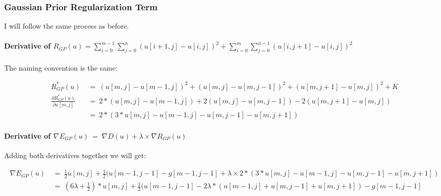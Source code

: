 \documentclass{report}
\begin{document}
			\subsubsection{Gaussian Prior Regularization Term}
			\startsubsection
				I will follow the same process as before.
				\vspace{-0.4cm} \paragraph{Derivative of $R_{GP}(u) = \sum_{i=0}^{m-1} \sum_{j=0}^{n} ( u[i+1,j] - u[i,j] )^2 + \sum_{i=0}^{m} \sum_{j=0}^{n-1} ( u[i,j+1] - u[i,j] )^2$}
				\startsubsection
					\vspace{0.2cm} The naming convention is the same:
				\closesection
				\begin{adjustwidth}{-4em}{}
					\vspace{-0.5cm}
					\begin{align*}
						R_{GP}^*(u) \ & = \ (u[m,j] - u[m-1,j])^2 + (u[m,j] - u[m,j-1])^2 + (u[m,j+1] - u[m,j])^2 + K \\
						\frac{\partial R_{GP}^*(u)}{\partial u[m,j]} \ & = \ 2 * (u[m,j] - u[m-1,j]) + 2 (u[m,j] - u[m,j-1]) - 2 (u[m,j+1] - u[m,j]) \\
						& = \ 2 * (3 * u[m,j] - u[m-1,j] - u[m,j-1] - u[m,j+1])
					\end{align*}
				\end{adjustwidth}
				\vspace{-0.4cm} \paragraph{Derivative of $\nabla E_{GP}(u) \ = \ \nabla D(u) + \lambda \times \nabla R_{GP}(u)$}
				\startsubsection
					Adding both derivatives together we will get:
				\closesection
				\begin{adjustwidth}{-7em}{}
					\vspace{-0.6cm}
					\begin{align*}
						\nabla E_{GP}(u) \ & = \ \frac{1}{2} u[m,j]  + \frac{1}{2} (u[m-1,j-1] - g[m-1,j-1] + \lambda \times 2 * (3 * u[m,j] - u[m-1,j] - u[m,j-1] - u[m,j+1]) \\
						& = \ (6 \lambda + \frac{1}{2}) * u[m,j]  + \frac{1}{2} (u[m-1,j-1] - 2\lambda*(u[m-1,j] + u[m,j-1] + u[m,j+1]) - g[m-1,j-1]
					\end{align*}
				\end{adjustwidth}
			\closesection
\end{document}
